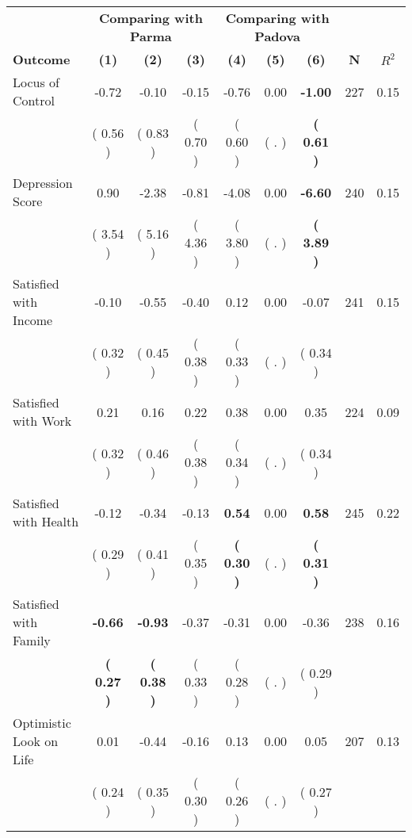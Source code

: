 \begin{tabular}{lcccccccc}
\toprule
 & \multicolumn{3}{c}{\textbf{Comparing with Parma}} & \multicolumn{3}{c}{\textbf{Comparing with Padova}} & \\
\cmidrule(lr){2-4} \cmidrule(lr){5-7} 
 \textbf{Outcome} & \textbf{(1)} & \textbf{(2)} & \textbf{(3)} & \textbf{(4)} & \textbf{(5)} & \textbf{(6)} & \textbf{N} & \textbf{$ R^2$} \\
\midrule
Locus of Control &     -0.72 &     -0.10 &     -0.15 &     -0.76 &      0.00 & \textbf{    -1.00} & 227 &       0.15 \\ 
 & (     0.56 ) & (     0.83 ) & (     0.70 ) & (     0.60 ) & (        . ) & \textbf{(     0.61 )} & \\
Depression Score &      0.90 &     -2.38 &     -0.81 &     -4.08 &      0.00 & \textbf{    -6.60} & 240 &       0.15 \\ 
 & (     3.54 ) & (     5.16 ) & (     4.36 ) & (     3.80 ) & (        . ) & \textbf{(     3.89 )} & \\
Satisfied with Income &     -0.10 &     -0.55 &     -0.40 &      0.12 &      0.00 &     -0.07 & 241 &       0.15 \\ 
 & (     0.32 ) & (     0.45 ) & (     0.38 ) & (     0.33 ) & (        . ) & (     0.34 ) & \\
Satisfied with Work &      0.21 &      0.16 &      0.22 &      0.38 &      0.00 &      0.35 & 224 &       0.09 \\ 
 & (     0.32 ) & (     0.46 ) & (     0.38 ) & (     0.34 ) & (        . ) & (     0.34 ) & \\
Satisfied with Health &     -0.12 &     -0.34 &     -0.13 & \textbf{     0.54} &      0.00 & \textbf{     0.58} & 245 &       0.22 \\ 
 & (     0.29 ) & (     0.41 ) & (     0.35 ) & \textbf{(     0.30 )} & (        . ) & \textbf{(     0.31 )} & \\
Satisfied with Family & \textbf{    -0.66} & \textbf{    -0.93} &     -0.37 &     -0.31 &      0.00 &     -0.36 & 238 &       0.16 \\ 
 & \textbf{(     0.27 )} & \textbf{(     0.38 )} & (     0.33 ) & (     0.28 ) & (        . ) & (     0.29 ) & \\
Optimistic Look on Life &      0.01 &     -0.44 &     -0.16 &      0.13 &      0.00 &      0.05 & 207 &       0.13 \\ 
 & (     0.24 ) & (     0.35 ) & (     0.30 ) & (     0.26 ) & (        . ) & (     0.27 ) & \\

\end{tabular}
